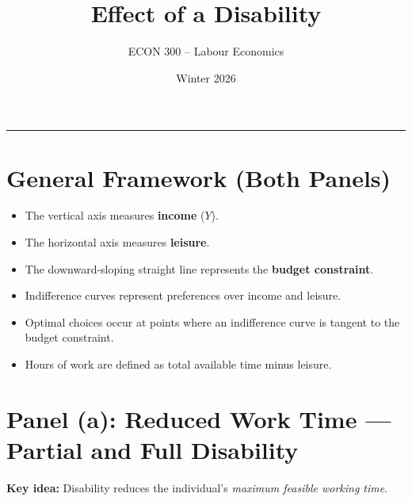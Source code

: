 \documentclass[12pt]{article}
\title{Effect of a Disability}
\author{ECON 300 -- Labour Economics}
\date{Winter 2026}
\begin{document}
\maketitle
\hrule



\vspace{1em}
\section*{General Framework (Both Panels)}

\begin{itemize}
\item The vertical axis measures \textbf{income} ($Y$).
\item The horizontal axis measures \textbf{leisure}.
\item The downward-sloping straight line represents the \textbf{budget constraint}.
\item Indifference curves represent preferences over income and leisure.
\item Optimal choices occur at points where an indifference curve is tangent to the budget constraint.
\item Hours of work are defined as total available time minus leisure.
\end{itemize}

\vspace{0.5em}

\section*{Panel (a): Reduced Work Time --- Partial and Full Disability}

\textbf{Key idea:} Disability reduces the individual’s \emph{maximum feasible working time}.
\end{document}
